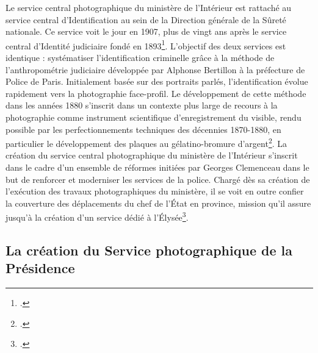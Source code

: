 Le service central photographique du ministère de l'Intérieur est rattaché au service central d'Identification au sein de la Direction générale de la Sûreté nationale. Ce service voit le jour en 1907, plus de vingt ans après le service central d'Identité judiciaire fondé en 1893\footcite{chaveReportagesPhotographiquesPresidence2016, batReportagesPhotographiquesAutour2016}. L'objectif des deux services est identique : systématiser l'identification criminelle grâce à la méthode de l'anthropométrie judiciaire développée par Alphonse Bertillon à la préfecture de Police de Paris. Initialement basée sur des portraits parlés, l'identification évolue rapidement vers la photographie face-profil. Le développement de cette méthode dans les années 1880 s'inscrit dans un contexte plus large de recours à la photographie comme instrument scientifique d'enregistrement du visible, rendu possible par les perfectionnements techniques des décennies 1870-1880, en particulier le développement des plaques au gélatino-bromure d'argent\footcite[p.138]{bajacPhotographieDaguerreotypeAu2010}. La création du service central photographique du ministère de l'Intérieur s'inscrit dans le cadre d'un ensemble de réformes initiées par Georges Clemenceau dans le but de renforcer et moderniser les services de la police. Chargé dès sa création de l'exécution des travaux photographiques du ministère, il se voit en outre confier la couverture des déplacements du chef de l'État en province, mission qu'il assure jusqu'à la création d'un service dédié à l'Élysée\footcite{batReportagesPhotographiquesAutour2016}.

\subsection*{La création du Service photographique de la Présidence}

